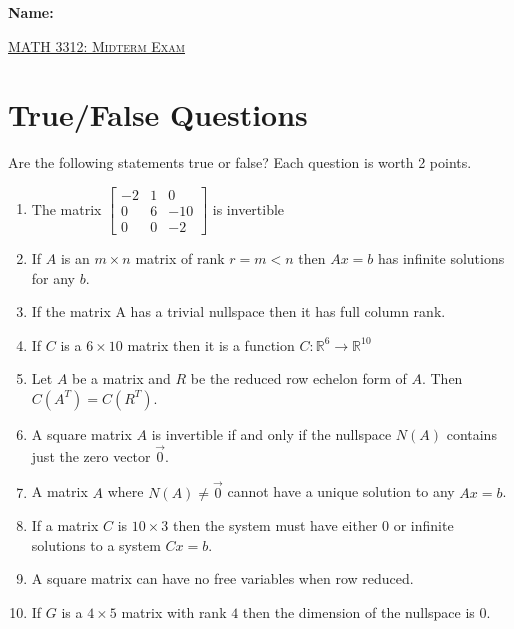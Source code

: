 \documentclass[12pt, a4paper]{article}
\theoremstyle{break}
\begin{document}
\begin{flushleft}
\Large \textbf{Name: } \underline{\hspace{8cm}} \\
\end{flushleft}
\vspace{0.25in}
\begin{center}
{\Large \textsc{\underline{MATH 3312: Midterm Exam}}}
\vspace{0.125in}
\end{center}
\section{True/False Questions}
Are the following statements true or false? Each question is worth 2 points. 
\begin{enumerate}
\item \underline{\hspace{1cm}} The matrix $
\begin{bmatrix}
-2 & 1 & 0 \\
0 &6 &-10 \\
0 & 0 & -2 
\end{bmatrix} $ is invertible
\item \underline{\hspace{1cm}}  If $A$ is an $m\times n$ matrix of rank $r=m<n$ then $Ax=b$ has infinite solutions for any $b$. 
\item \underline{\hspace{1cm}} If the matrix A has a trivial nullspace then it has full column rank.
\item \underline{\hspace{1cm}} If $C$ is a $6 \times 10$ matrix then it is a function $C: \mathbb{R}^6 \longrightarrow \mathbb{R}^{10}$
\item \underline{\hspace{1cm}} Let $A$ be a matrix and $R$ be the reduced row echelon form of $A$. Then $C(A^T)=C(R^T)$.  
\item \underline{\hspace{1cm}} A square matrix $A$ is invertible if and only if the nullspace $N(A)$ contains just the zero vector $\vec{0}$. 
\item  \underline{\hspace{1cm}} A matrix $A$ where $N(A) \neq \vec{0}$ cannot have a unique solution to any $Ax=b$. 
\item  \underline{\hspace{1cm}} If a matrix $C$ is $10 \times 3$ then the system must have either 0 or infinite solutions to a system $Cx=b$. 
\item  \underline{\hspace{1cm}} A square matrix can have no free variables when row reduced.
\item  \underline{\hspace{1cm}} If $G$ is a $4 \times 5$ matrix with rank $4$ then the dimension of the nullspace is $0$. 
\end{enumerate}
\newpage
\end{document}
